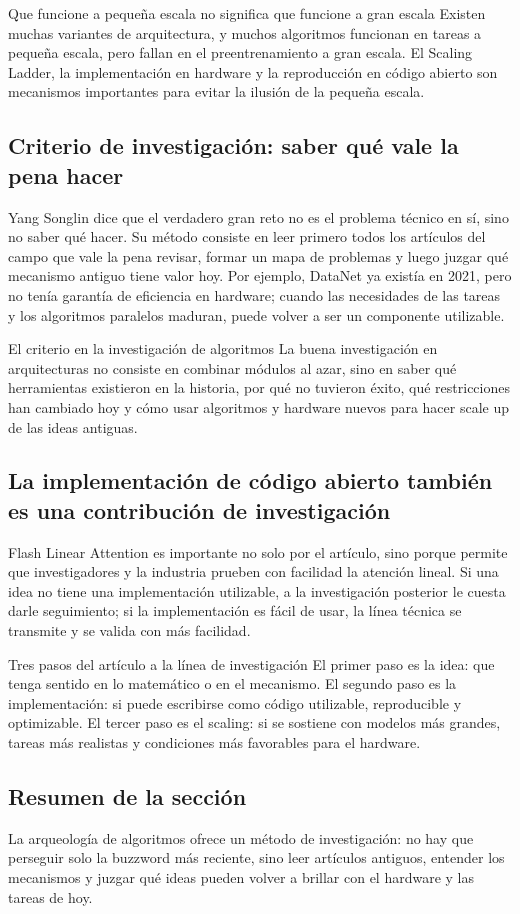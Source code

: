 \begin{warningbox}{Que funcione a pequeña escala no significa que funcione a gran escala}
Existen muchas variantes de arquitectura, y muchos algoritmos funcionan en tareas a pequeña escala, pero fallan en el preentrenamiento a gran escala. El Scaling Ladder, la implementación en hardware y la reproducción en código abierto son mecanismos importantes para evitar la ilusión de la pequeña escala.
\end{warningbox}

\subsection{Criterio de investigación: saber qué vale la pena hacer}

Yang Songlin dice que el verdadero gran reto no es el problema técnico en sí, sino no saber qué hacer. Su método consiste en leer primero todos los artículos del campo que vale la pena revisar, formar un mapa de problemas y luego juzgar qué mecanismo antiguo tiene valor hoy. Por ejemplo, DataNet ya existía en 2021, pero no tenía garantía de eficiencia en hardware; cuando las necesidades de las tareas y los algoritmos paralelos maduran, puede volver a ser un componente utilizable.

\begin{importantbox}{El criterio en la investigación de algoritmos}
La buena investigación en arquitecturas no consiste en combinar módulos al azar, sino en saber qué herramientas existieron en la historia, por qué no tuvieron éxito, qué restricciones han cambiado hoy y cómo usar algoritmos y hardware nuevos para hacer scale up de las ideas antiguas.
\end{importantbox}

\subsection{La implementación de código abierto también es una contribución de investigación}

Flash Linear Attention es importante no solo por el artículo, sino porque permite que investigadores y la industria prueben con facilidad la atención lineal. Si una idea no tiene una implementación utilizable, a la investigación posterior le cuesta darle seguimiento; si la implementación es fácil de usar, la línea técnica se transmite y se valida con más facilidad.

\begin{knowledgebox}{Tres pasos del artículo a la línea de investigación}
El primer paso es la idea: que tenga sentido en lo matemático o en el mecanismo. El segundo paso es la implementación: si puede escribirse como código utilizable, reproducible y optimizable. El tercer paso es el scaling: si se sostiene con modelos más grandes, tareas más realistas y condiciones más favorables para el hardware.
\end{knowledgebox}

\subsection{Resumen de la sección}

La arqueología de algoritmos ofrece un método de investigación: no hay que perseguir solo la buzzword más reciente, sino leer artículos antiguos, entender los mecanismos y juzgar qué ideas pueden volver a brillar con el hardware y las tareas de hoy.
